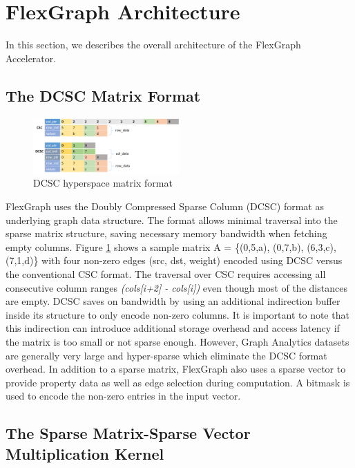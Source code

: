 \section{FlexGraph Architecture}

In this section, we describes the overall architecture of the FlexGraph Accelerator.

\subsection{The DCSC Matrix Format}

\begin{figure}[htbp]
\centering
\includegraphics[width=0.5\textwidth]{figures/dcsc_format}
\caption{DCSC hyperspace matrix format}
\label{fig:DCSC_matrix_format}
\end{figure}

FlexGraph uses the Doubly Compressed Sparse Column (DCSC) \cite{DCSC} format as underlying graph data structure. The format allows minimal traversal into the sparse matrix structure, saving necessary memory bandwidth when fetching empty columns. Figure \ref{fig:DCSC_matrix_format} shows a sample matrix A = \{(0,5,a), (0,7,b), (6,3,c), (7,1,d)\} with four non-zero edges (src, dst, weight) encoded using DCSC versus the conventional CSC \cite{CSC} format. The traversal over CSC requires accessing all consecutive column ranges \textit{(cols[i+2] - cols[i])} even though most of the distances are empty. DCSC saves on bandwidth by using an additional indirection  buffer inside its structure to only encode non-zero columns. It is important to note that this indirection can introduce additional storage overhead and access latency if the matrix is too small or not sparse enough. However, Graph Analytics datasets are generally very large and hyper-sparse which eliminate the DCSC format overhead. In addition to a sparse matrix, FlexGraph also uses a sparse vector to provide property data as well as edge selection during computation. A bitmask is used to encode the non-zero entries in the input vector.

\subsection{The Sparse Matrix-Sparse Vector Multiplication Kernel}

